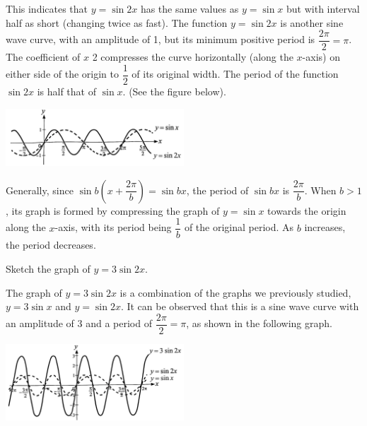 \documentclass{report}
\begin{document}
        This indicates that $y=\sin 2 x$ has the same values as $y=\sin x$ but with interval half as short (changing twice as fast). The function $y=\sin 2 x$ is another sine wave curve, with an amplitude of 1, but its minimum positive period is $\dfrac{2 \pi}{2}=\pi$. The coefficient of $x$ 2 compresses the curve horizontally (along the $x$-axis) on either side of the origin to $\dfrac{1}{2}$ of its original width. The period of the function $\sin 2 x$ is half that of $\sin x$. (See the figure below).
        \begin{center}
            \includegraphics[width=0.5\textwidth]{assets/9-25.jpg}
        \end{center}

        Generally, since $\sin b\left(x+\dfrac{2 \pi}{b}\right)=\sin b x$, the period of $\sin b x$ is $\dfrac{2 \pi}{b}$. When $b>1$, its graph is formed by compressing the graph of $y=\sin x$ towards the origin along the $x$-axis, with its period being $\dfrac{1}{b}$ of the original period. As $b$ increases, the period decreases.

        \begin{question}
            Sketch the graph of $y=3\sin 2x$.

            \sol{}

            \noindent The graph of $y=3 \sin 2 x$ is a combination of the graphs we previously studied, $y=3 \sin x$ and $y=\sin 2 x$. It can be observed that this is a sine wave curve with an amplitude of 3 and a period of $\dfrac{2 \pi}{2}=\pi$, as shown in the following graph.
            \vspace{-1.5em}
            \begin{center}
                \includegraphics[width=0.5\textwidth]{assets/9-26.jpg}
            \end{center}
        \end{question}

        \vspace{-1.5em}
\end{document}
